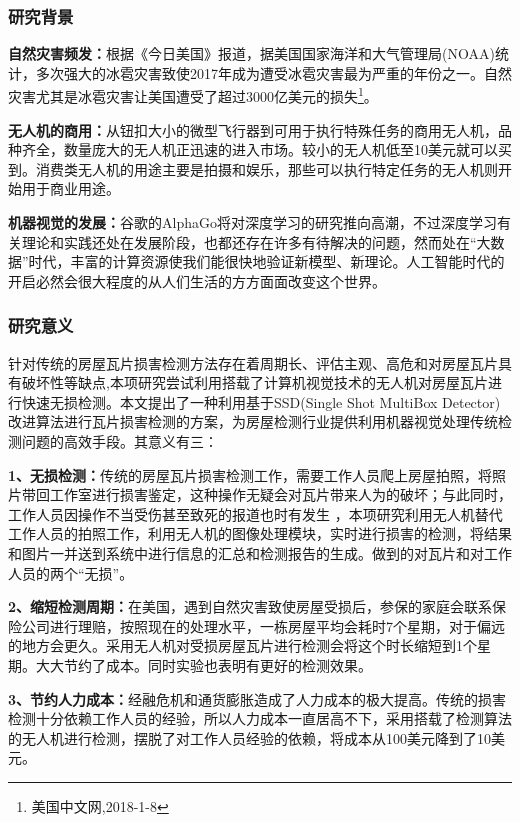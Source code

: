 \subsubsection{研究背景}
\textbf{自然灾害频发：}根据《今日美国》报道，据美国国家海洋和大气管理局(NOAA)统计，多次强大的冰雹灾害致使2017年成为遭受冰雹灾害最为严重的年份之一。自然灾害尤其是冰雹灾害让美国遭受了超过3000亿美元的损失\footnote{美国中文网,2018-1-8}。

\textbf{无人机的商用：}从钮扣大小的微型飞行器到可用于执行特殊任务的商用无人机，品种齐全，数量庞大的无人机正迅速的进入市场。较小的无人机低至10美元就可以买到。消费类无人机的用途主要是拍摄和娱乐，那些可以执行特定任务的无人机则开始用于商业用途。

\textbf{机器视觉的发展：}谷歌的AlphaGo将对深度学习的研究推向高潮，不过深度学习有关理论和实践还处在发展阶段，也都还存在许多有待解决的问题，然而处在“大数据”时代，丰富的计算资源使我们能很快地验证新模型、新理论。人工智能时代的开启必然会很大程度的从人们生活的方方面面改变这个世界。

\subsubsection{研究意义}
针对传统的房屋瓦片损害检测方法存在着周期长、评估主观、高危和对房屋瓦片具有破坏性等缺点,本项研究尝试利用搭载了计算机视觉技术的无人机对房屋瓦片进行快速无损检测。本文提出了一种利用基于SSD(Single Shot MultiBox Detector)\cite{ssd}改进算法进行瓦片损害检测的方案，为房屋检测行业提供利用机器视觉处理传统检测问题的高效手段。其意义有三：

\textbf{1、无损检测：}传统的房屋瓦片损害检测工作，需要工作人员爬上房屋拍照，将照片带回工作室进行损害鉴定，这种操作无疑会对瓦片带来人为的破坏；与此同时，工作人员因操作不当受伤甚至致死的报道也时有发生 ，本项研究利用无人机替代工作人员的拍照工作，利用无人机的图像处理模块，实时进行损害的检测，将结果和图片一并送到系统中进行信息的汇总和检测报告的生成。做到的对瓦片和对工作人员的两个“无损”。

\textbf{2、缩短检测周期：}在美国，遇到自然灾害致使房屋受损后，参保的家庭会联系保险公司进行理赔，按照现在的处理水平，一栋房屋平均会耗时7个星期，对于偏远的地方会更久。采用无人机对受损房屋瓦片进行检测会将这个时长缩短到1个星期。大大节约了成本。同时实验也表明有更好的检测效果。

\textbf{3、节约人力成本：}经融危机和通货膨胀造成了人力成本的极大提高。传统的损害检测十分依赖工作人员的经验，所以人力成本一直居高不下，采用搭载了检测算法的无人机进行检测，摆脱了对工作人员经验的依赖，将成本从100美元降到了10美元。